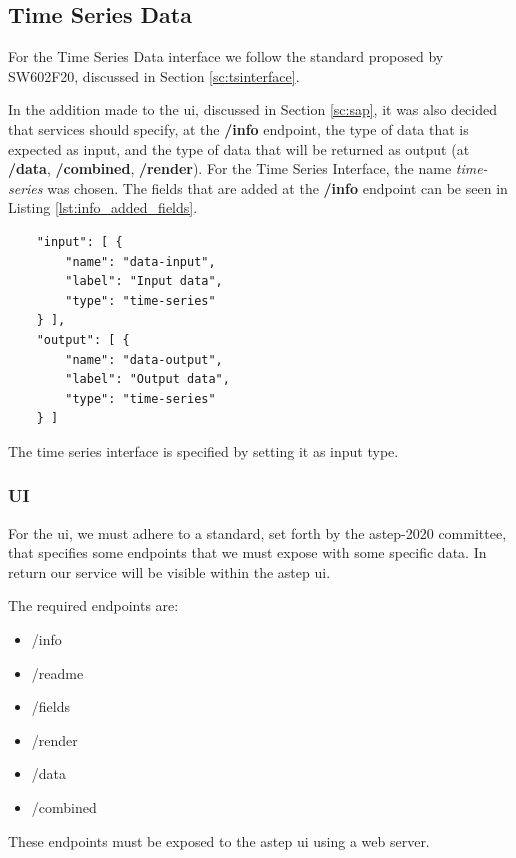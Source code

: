 \subsection*{Time Series Data}
For the Time Series Data interface we follow the standard proposed by SW602F20, discussed in Section \ref{sc:tsinterface}. 

In the addition made to the \gls{ui}, discussed in Section \ref{sc:sap}, it was also decided that services should specify, at the \textbf{/info} \gls{endpoint}, the type of data that is expected as input, and the type of data that will be returned as output (at \textbf{/data}, \textbf{/combined}, \textbf{/render}). For the Time Series Interface, the name \textit{time-series} was chosen. The fields that are added at the \textbf{/info} \gls{endpoint} can be seen in Listing \ref{lst:info_added_fields}.

\begin{listing}[htbp]
    \begin{verbatim}
    "input": [ {
        "name": "data-input",
        "label": "Input data",
        "type": "time-series"
    } ],
    "output": [ {
        "name": "data-output",
        "label": "Output data",
        "type": "time-series"
    } ]
    \end{verbatim}
    \caption{The time series interface is specified by setting it as input type.}
    \label{lst:info_added_fields}
\end{listing}

\subsubsection*{UI}
For the \gls{ui}, we must adhere to a standard, set forth by the \gls{astep}-2020 committee, that specifies some endpoints that we must expose with some specific data. In return our service will be visible within the \gls{astep} \gls{ui}.

The required endpoints are:
\begin{itemize}
    \item /info
    \item /readme
    \item /fields
    \item /render
    \item /data
    \item /combined
\end{itemize}
These endpoints must be exposed to the \gls{astep} \gls{ui} using a web server.